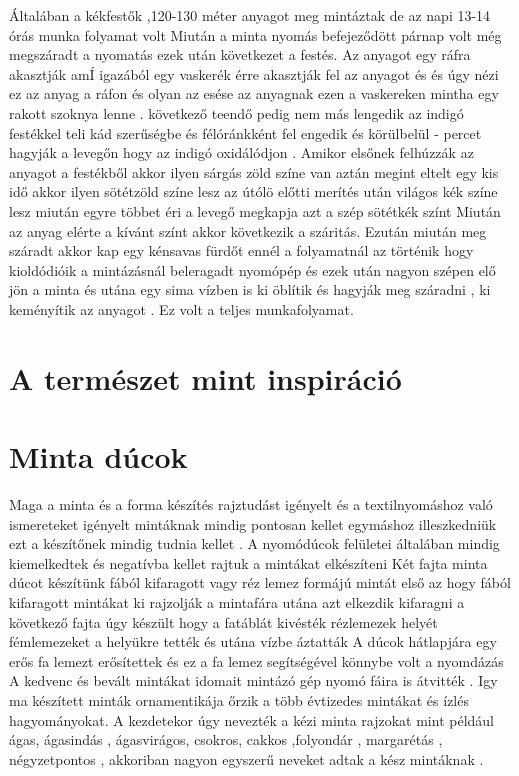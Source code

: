 \documentclass[fontsize=12pt, appendixprefix=true]{scrreprt}
\begin{document}
Általában a kékfestők  ,120-130 méter anyagot meg mintáztak de az napi 13-14 órás munka folyamat volt
Miután a minta nyomás befejeződött  párnap volt még megszáradt a nyomatás ezek után következet a festés.
Az anyagot egy ráfra akasztják   amÍ  igazából egy vaskerék érre akasztják fel az anyagot és és úgy nézi ez az anyag a ráfon és olyan az esése az anyagnak ezen a vaskereken mintha egy rakott szoknya lenne .
következő teendő pedig nem  más  lengedik  az indigó festékkel teli kád szerűségbe és  félóránkként fel engedik és körülbelül - percet hagyják a levegőn hogy az indigó oxidálódjon .
Amikor elsőnek felhúzzák az anyagot a festékből akkor ilyen sárgás zöld színe van aztán megint eltelt egy kis idő akkor ilyen sötétzöld színe lesz az útólö előtti merítés után világos kék színe lesz 
miután egyre többet éri a levegő  megkapja azt a szép sötétkék színt 
Miután az anyag elérte a kívánt színt akkor következik a száritás. Ezután miután meg száradt akkor kap egy kénsavas fürdőt ennél a folyamatnál az történik hogy kioldódióik a mintázásnál beleragadt nyomópép és ezek után nagyon szépen elő jön a minta és utána egy sima vízben is ki öblítik  és hagyják meg száradni , ki keményítik az anyagot .
Ez volt a teljes munkafolyamat.


\section{A természet mint inspiráció}


\section{Minta dúcok}
Maga a minta és a forma készítés rajztudást igényelt és a textilnyomáshoz való ismereteket igényelt 
mintáknak mindig pontosan kellet egymáshoz illeszkedniük  ezt a készítőnek mindig tudnia kellet .
A nyomódúcok felületei általában mindig kiemelkedtek és negatívba kellet rajtuk a mintákat elkészíteni 
Két fajta minta dúcot készítünk fából kifaragott vagy réz lemez formájú mintát 
első az hogy  fából kifaragott mintákat ki rajzolják a mintafára utána azt elkezdik kifaragni 
a következő fajta úgy készült hogy a fatáblát kivésték  rézlemezek helyét fémlemezeket a helyükre tették és utána vízbe áztatták 
A dúcok hátlapjára egy erős fa lemezt erősítettek és ez a fa lemez segítségével könnybe volt a nyomdázás
A kedvenc és bevált mintákat idomait mintázó gép nyomó fáira is átvitték .
Igy ma készített minták ornamentikája őrzik a több évtizedes mintákat és ízlés hagyományokat.
A kezdetekor úgy nevezték a kézi minta rajzokat mint például  ágas, ágasindás , ágasvirágos, csokros, cakkos ,folyondár , margarétás , négyzetpontos ,
akkoriban nagyon egyszerű neveket adtak a kész mintáknak .
\end{document}
